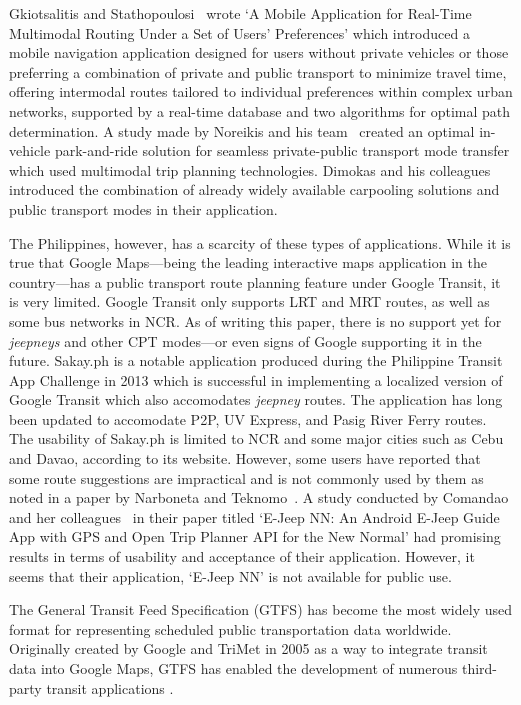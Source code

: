 \documentclass[journal]{./IEEE/IEEEtran}
\begin{document}
Gkiotsalitis and Stathopoulosi~\cite{Gkiotsalitis15} wrote `A Mobile Application for Real-Time Multimodal Routing Under a Set of Users’ Preferences' which introduced a mobile navigation application designed for users without private vehicles or those preferring a combination of private and public transport to minimize travel time, offering intermodal routes tailored to individual preferences within complex urban networks, supported by a real-time database and two algorithms for optimal path determination.
A study made by Noreikis and his team~\cite{Noreikis14} created an optimal in-vehicle park-and-ride solution for seamless private-public transport mode transfer which used multimodal trip planning technologies.
Dimokas and his colleagues~\cite{Dimokas18} introduced the combination of already widely available carpooling solutions and public transport modes in their application.

The Philippines, however, has a scarcity of these types of applications. While it is true that Google Maps---being the leading interactive maps application in the country---has a public transport route planning feature under Google Transit, it is very limited.
Google Transit only supports LRT and MRT routes, as well as some bus networks in NCR\@.
As of writing this paper, there is no support yet for \textit{jeepneys} and other CPT modes---or even signs of Google supporting it in the future.
Sakay.ph is a notable application produced during the Philippine Transit App Challenge in 2013 which is successful in implementing a localized version of Google Transit which also accomodates \textit{jeepney} routes.
The application has long been updated to accomodate P2P, UV Express, and Pasig River Ferry routes. The usability of Sakay.ph is limited to NCR and some major cities such as Cebu and Davao, according to its website. However, some users have reported that some route suggestions are impractical and is not commonly used by them as noted in a paper by Narboneta and Teknomo~\cite{Narboneta15}.
A study conducted by Comandao and her colleagues~\cite{Comandao21} in their paper titled `E-Jeep NN\@: An Android E-Jeep Guide App with GPS and Open Trip Planner API for the New Normal' had promising results in terms of usability and acceptance of their application.
However, it seems that their application, `E-Jeep NN' is not available for public use.

The General Transit Feed Specification (GTFS) has become the most widely used format for representing scheduled public transportation data worldwide.
Originally created by Google and TriMet in 2005 as a way to integrate transit data into Google Maps, GTFS has enabled the development of numerous third-party transit applications \cite{Antrim01}.
\end{document}

